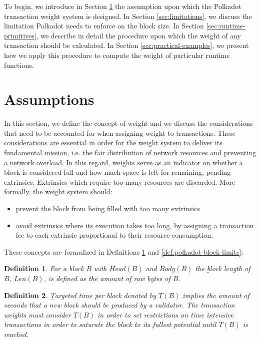 \documentclass[11pt,a4paper]{article}
\newtheorem{definition}{Definition}
\begin{document}
To begin, we introduce in Section \ref{sec:assumptions} the assumption upon
which the Polkadot transaction weight system is designed. In Section
\ref{sec:limitations}, we discuss the limitation Polkadot needs to enforce on
the block size. In Section \ref{sec:runtime-primitives}, we describe in detail
the procedure upon which the weight of any transaction should be calculated. In
Section \ref{sec:practical-examples}, we present how we apply this procedure to
compute the weight of particular runtime functions.

\section{Assumptions}\label{sec:assumptions}

In this section, we define the concept of weight and we discuss the
considerations that need to be accounted for when assigning weight to
transactions. These considerations are essential in order for the weight system
to deliver its fundamental mission, i.e. the fair distribution of network
resources and preventing a network overload. In this regard, weights serve as an
indicator on whether a block is considered full and how much space is left for
remaining, pending extrinsics. Extrinsics which require too many resources are
discarded. More formally, the weight system should:

\begin{itemize}
\item prevent the block from being filled with too many extrinsics
\item avoid extrinsics where its execution takes too long, by assigning a
transaction fee to each extrinsic proportional to their resource consumption.
\end{itemize}

These concepts are formalized in Definitions \ref{def:block-length} and
\ref{def:polkadot-block-limits}:

\begin{definition}
  \label{def:block-length}
  For a block $B$ with $Head(B)$ and $Body(B)$ the {\b block length of $B$},
  $Len(B)$, is defined as the amount of raw bytes of $B$.
\end{definition}

\begin{definition}
  \label{def:target-time-per-block}
  {\b Targeted time per block} denoted by $T(B)$ implies the amount of seconds
  that a new block should be produced by a validator. The transaction weights
  must consider $T(B)$ in order to set restrictions on time intensive
  transactions in order to saturate the block to its fullest potential until
  $T(B)$ is reached.
\end{definition}
\end{document}
